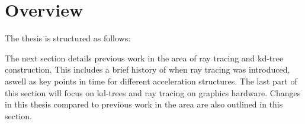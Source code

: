 




\section{Overview}

The thesis is structured as follows:


The next section details previous work in the area of ray tracing and
kd-tree construction. This includes a brief history of when ray
tracing was introduced, aswell as key points in time for different
acceleration structures. The last part of this section will focus on
kd-trees and ray tracing on graphics hardware. Changes in this thesis
compared to previous work in the area are also outlined in this
section.

